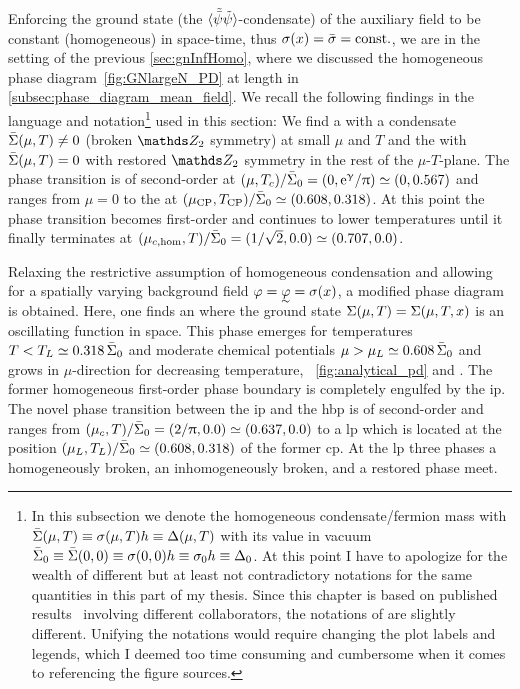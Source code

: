 Enforcing the ground state (the $\langle\tilde{\bar{\psi}}\tilde{\psi}\rangle$-condensate) of the auxiliary field to be constant (homogeneous) in space-time, thus ${\sigma(x ) = \bar{\sigma} = \mathrm{const.}}$, we are in the setting of the previous \cref{sec:gnInfHomo}, where we discussed the homogeneous phase diagram~\ref{fig:GNlargeN_PD} at length in \cref{subsec:phase_diagram_mean_field}.
We recall the following findings in the language and notation\footnote{
In this subsection we denote the homogeneous condensate/fermion mass with $\bar{\Sigma} ( \mu, T ) \equiv \sigma(\mu,T) h \equiv \Delta(\mu,T)$ with its value in vacuum $\bar{\Sigma}_0\equiv \bar{\Sigma} ( 0, 0 )\equiv\sigma(0,0) h \equiv\sigma_0 h \equiv \Delta_0$. 
At this point I have to apologize for the wealth of different \dash{} but at least not contradictory \dash{} notations for the same quantities in this part of my thesis.
Since this chapter is based on published results~\cite{Stoll:2021ori,Koenigstein:2021llr} involving different collaborators, the notations of  are slightly different.
Unifying the notations would require changing the plot labels and legends, which I deemed too time consuming and cumbersome when it comes to referencing the figure sources.
} used in this section:
We find a  with a condensate $\bar{\Sigma} ( \mu, T ) \neq 0$ (broken $\Z_2$ symmetry) at small $\mu$ and $T$ and the  with ${\bar{\Sigma} ( \mu, T ) = 0}$ with restored $\Z_2$ symmetry in the rest of the $\mu$-$T$-plane.
The phase transition is of second-order at ${( \mu, T_c )/\bar{\Sigma}_0 = ( 0, \mathrm{e}^\upgamma/\uppi ) \simeq (0,0.567 )}$ and ranges from ${\mu = 0}$ to the  at $( \mu_{\mathrm{CP}}, T_{\mathrm{CP}} )/\bar{\Sigma}_0 \simeq ( 0.608, 0.318 )$.
At this point the phase transition becomes first-order and continues to lower temperatures until it finally terminates at ${( \mu_{c, \text{hom}}, T )/\bar{\Sigma}_0 = ( 1/\sqrt{2}, 0.0 ) \simeq ( 0.707, 0.0 )}$.\bigskip
	
Relaxing the restrictive assumption of homogeneous condensation and allowing for a spatially varying background field ${\MFphi=\MFEIphi =\sigma( x )}$, a modified phase diagram is obtained. Here, one finds an  where the ground state ${\Sigma ( \mu, T ) = \Sigma ( \mu, T, x )}$ is an oscillating function in space.
This phase emerges for temperatures $T < T_L \simeq 0.318\, \bar{\Sigma}_0$ and moderate chemical potentials $\mu >  \mu_L \simeq 0.608 \, \bar{\Sigma}_0$ and grows in $\mu$-direction for decreasing temperature, \cf{}\ \cref{fig:analytical_pd} and  .
The former homogeneous first-order phase boundary is completely engulfed by the \gls{ip}.
The novel phase transition between the \gls{ip} and the \gls{hbp} is of second-order and ranges from ${( \mu_{c}, T )/\bar{\Sigma}_0 = ( 2/\uppi, 0. 0 ) \simeq ( 0.637, 0.0 )}$ to a \gls{lp} which is located at the position $( \mu_L, T_L )/\bar{\Sigma}_0 \simeq ( 0.608, 0.318 )$ of the former \gls{cp}. At the \gls{lp} three phases \dash{} a homogeneously broken, an inhomogeneously broken, and a restored phase \dash{} meet.
	
